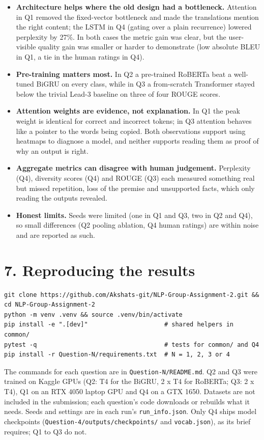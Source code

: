\documentclass[10pt,a4paper]{article}
\providecommand{\tightlist}{\setlength{\itemsep}{0pt}\setlength{\parskip}{0pt}}
\begin{document}
\begin{itemize}
\tightlist
\item
  \textbf{Architecture helps where the old design had a bottleneck.} Attention in Q1 removed the fixed-vector bottleneck and made the translations mention the right content; the LSTM in Q4 (gating over a plain recurrence) lowered perplexity by 27\%. In both cases the metric gain was clear, but the user-visible quality gain was smaller or harder to demonstrate (low absolute BLEU in Q1, a tie in the human ratings in Q4).
\item
  \textbf{Pre-training matters most.} In Q2 a pre-trained RoBERTa beat a well-tuned BiGRU on every class, while in Q3 a from-scratch Transformer stayed below the trivial Lead-3 baseline on three of four ROUGE scores.
\item
  \textbf{Attention weights are evidence, not explanation.} In Q1 the peak weight is identical for correct and incorrect tokens; in Q3 attention behaves like a pointer to the words being copied. Both observations support using heatmaps to diagnose a model, and neither supports reading them as proof of why an output is right.
\item
  \textbf{Aggregate metrics can disagree with human judgement.} Perplexity (Q4), diversity scores (Q4) and ROUGE (Q3) each measured something real but missed repetition, loss of the premise and unsupported facts, which only reading the outputs revealed.
\item
  \textbf{Honest limits.} Seeds were limited (one in Q1 and Q3, two in Q2 and Q4), so small differences (Q2 pooling ablation, Q4 human ratings) are within noise and are reported as such.
\end{itemize}

\hypertarget{reproducing-the-results}{%
\section{7. Reproducing the results}\label{reproducing-the-results}}

\begin{verbatim}
git clone https://github.com/Akshats-git/NLP-Group-Assignment-2.git && cd NLP-Group-Assignment-2
python -m venv .venv && source .venv/bin/activate
pip install -e ".[dev]"                     # shared helpers in common/
pytest -q                                   # tests for common/ and Q4
pip install -r Question-N/requirements.txt  # N = 1, 2, 3 or 4
\end{verbatim}

The commands for each question are in \texttt{Question-N/README.md}. Q2 and Q3 were trained on Kaggle GPUs (Q2: T4 for the BiGRU, 2 x T4 for RoBERTa; Q3: 2 x T4), Q1 on an RTX 4050 laptop GPU and Q4 on a GTX 1650. Datasets are not included in the submission; each question's code downloads or rebuilds what it needs. Seeds and settings are in each run's \texttt{run\_info.json}. Only Q4 ships model checkpoints (\texttt{Question-4/outputs/checkpoints/} and \texttt{vocab.json}), as its brief requires; Q1 to Q3 do not.
\end{document}
